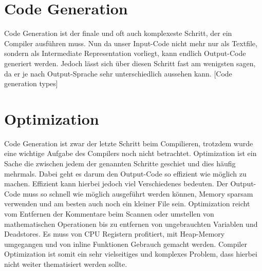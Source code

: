 \section{Code Generation}
Code Generation ist der finale und oft auch komplexeste Schritt, der ein Compiler ausführen muss. Nun da unser Input-Code nicht mehr nur als Textfile, sondern als Intermediate Representation vorliegt,
kann endlich Output-Code generiert werden. Jedoch lässt sich über diesen Schritt fast am wenigsten sagen, da er je nach Output-Sprache sehr unterschiedlich aussehen kann. 
[Code generation types]

\section{Optimization}
Code Generation ist zwar der letzte Schritt beim Compilieren, trotzdem wurde eine wichtige Aufgabe des Compilers noch nicht betrachtet. Optimization ist ein Sache die zwischen jedem der genannten Schritte geschiet
und dies häufig mehrmals. Dabei geht es darum den Output-Code so effizient wie möglich zu machen. Effizient kann hierbei jedoch viel Verschiedenes bedeuten. Der Output-Code muss so schnell wie möglich ausgeführt werden können,
Memory sparsam verwenden und am besten auch noch ein kleiner File sein. Optimization reicht vom Entfernen der Kommentare beim Scannen oder umstellen von mathematischen Operationen bis zu entfernen von ungebrauchten Variablen und Deadstores.
Es muss von CPU Registern profitiert, mit Heap-Memory umgegangen und von inline Funktionen Gebrauch gemacht werden. Compiler Optimization ist somit ein sehr vielseitiges und komplexes Problem,
dass hierbei nicht weiter thematisiert werden sollte.